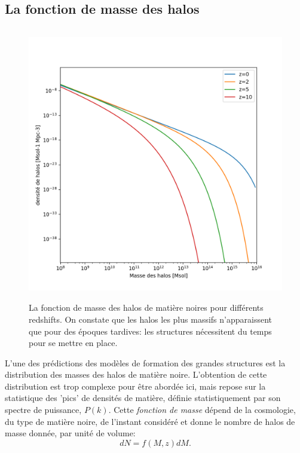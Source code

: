 \subsection{La fonction de masse des halos}
\begin{figure}[htbp]
	\centering
		\includegraphics[height=12cm]{figs/hmf.png}
	\caption[La fonction de masse des halos de matière noires pour différents redshifts]{La fonction de masse des halos de matière noires pour différents redshifts. On constate que les halos les plus massifs n'apparaissent que pour des époques tardives: les structures nécessitent du temps pour se mettre en place.} 
	\label{f:hmf}
\end{figure}
L'une des prédictions des modèles de formation des grandes structures est la distribution des masses des halos de matière noire. L'obtention de cette distribution est trop complexe pour être abordée ici, mais repose sur la statistique des 'pics' de densités de matière, définie statistiquement par son spectre de puissance, $P(k)$. Cette \textit{fonction de masse} dépend de la cosmologie, du type de matière noire, de l'instant considéré et donne le nombre de halos de masse donnée, par unité de volume:
\begin{equation}
dN=f(M,z)dM.
\end{equation}
